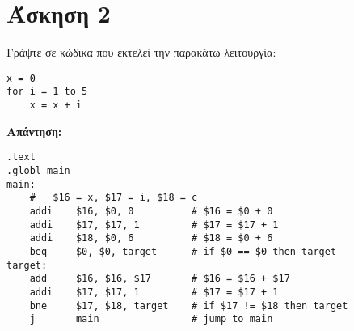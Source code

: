 \documentclass[a4paper,12pt]{article}
\begin{document}
\newpage
\section*{Άσκηση 2}
Γράψτε σε κώδικα που εκτελεί την παρακάτω λειτουργία:
\begin{lstlisting}
x = 0
for i = 1 to 5
    x = x + i
\end{lstlisting}
\textbf{Απάντηση:}
\begin{lstlisting}
.text
.globl main
main:
    #   $16 = x, $17 = i, $18 = c
    addi	$16, $0, 0			# $16 = $0 + 0
    addi	$17, $17, 1			# $17 = $17 + 1
    addi	$18, $0, 6			# $18 = $0 + 6
    beq		$0, $0, target  	# if $0 == $0 then target
target:
    add		$16, $16, $17		# $16 = $16 + $17
    addi	$17, $17, 1			# $17 = $17 + 1
    bne		$17, $18, target	# if $17 != $18 then target
    j		main				# jump to main
\end{lstlisting}
\end{document}
